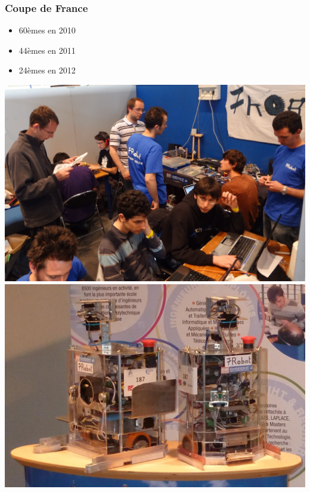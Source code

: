 \documentclass[9pt]{beamer}
\begin{document}
\begin{frame}
	\frametitle{Coupe de France}
	\begin{itemize}
		\item 60èmes en 2010
		\item 44èmes en 2011
		\item 24èmes en 2012
	\end{itemize}
	
	\vspace{1cm}
	
	\begin{center}
		\includegraphics[height=0.4\textheight]{cdf_travail}
		\includegraphics[height=0.4\textheight]{cdf_robots}
	\end{center}

\end{frame}
\end{document}
